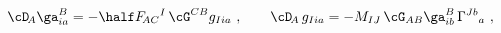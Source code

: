 \begin{equation} \label{Dg}
  \cD_{\!A} \ga^B_{ia} = -\half F_{\!AC}{}^I\, \cG^{CB} g_{Iia}\
  ,\qquad \cD_{\!A}\, g_{Iia} = -M_{IJ}\, \cG_{AB} \ga^B_{ib}\,
  \Gamma^{Jb}{}_a\ ,
 \end{equation} 
